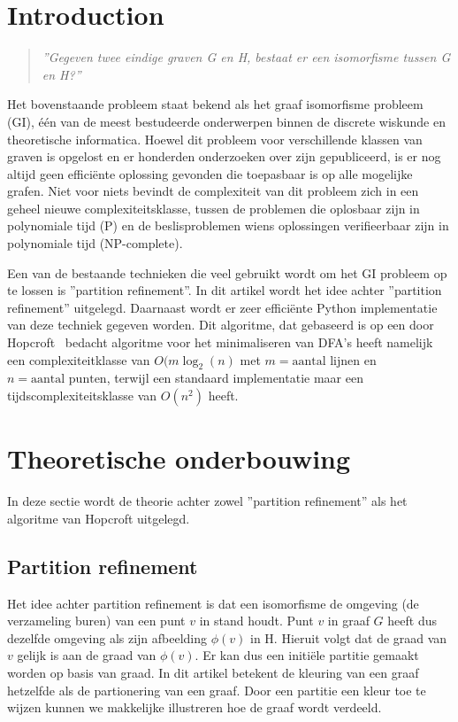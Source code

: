 \documentclass[twoside]{article}
\begin{document}
\begin{multicols}{2} %



\section*{Introduction}
\begin{quote}
\textit{''Gegeven twee eindige graven G en H, bestaat er een isomorfisme tussen G en H?''}
\end{quote}

Het bovenstaande probleem staat bekend als het graaf isomorfisme probleem  (GI), \'e\'en van de meest bestudeerde onderwerpen binnen de discrete wiskunde en theoretische informatica. Hoewel dit probleem voor verschillende klassen van graven is opgelost  en er honderden onderzoeken over zijn gepubliceerd, is er nog altijd geen effici\"ente oplossing gevonden die toepasbaar is op alle mogelijke grafen. Niet voor niets bevindt de complexiteit van dit probleem zich in een geheel nieuwe complexiteitsklasse, tussen de problemen die oplosbaar zijn in polynomiale tijd (P) en de beslisproblemen wiens oplossingen verifieerbaar zijn in polynomiale tijd (NP-complete).

Een van de bestaande technieken die veel gebruikt wordt om het GI probleem op te lossen is ''partition refinement''. In dit artikel wordt het idee achter ''partition refinement'' uitgelegd. Daarnaast wordt er zeer effici\"ente Python implementatie van deze techniek gegeven worden. Dit algoritme, dat gebaseerd is op een door Hopcroft~\cite{MR0403320} bedacht algoritme voor het minimaliseren van DFA's heeft namelijk een complexiteitklasse van $O(m \log_{2} (n)$ met $m= \text{aantal lijnen}$ en $n = \text{aantal punten}$, terwijl een standaard implementatie maar een tijdscomplexiteitsklasse van $O(n^2)$ heeft.

\section{Theoretische onderbouwing}
In deze sectie wordt de theorie achter zowel ''partition refinement'' als het algoritme van Hopcroft uitgelegd.

\subsection{Partition refinement}
Het idee achter partition refinement is dat een isomorfisme de omgeving (de verzameling buren) van een punt $v$ in stand houdt. Punt $v$ in graaf $G$ heeft dus dezelfde omgeving als zijn afbeelding $\phi(v)$ in H. Hieruit volgt dat de graad van $v$ gelijk is aan de graad van $\phi(v)$. Er kan dus een initi\"ele partitie gemaakt worden op basis van graad. In dit artikel betekent de kleuring van een graaf hetzelfde als de partionering van een graaf. Door een partitie een kleur toe te wijzen kunnen we makkelijke illustreren hoe de graaf wordt verdeeld. 


\end{multicols}
\end{document}
